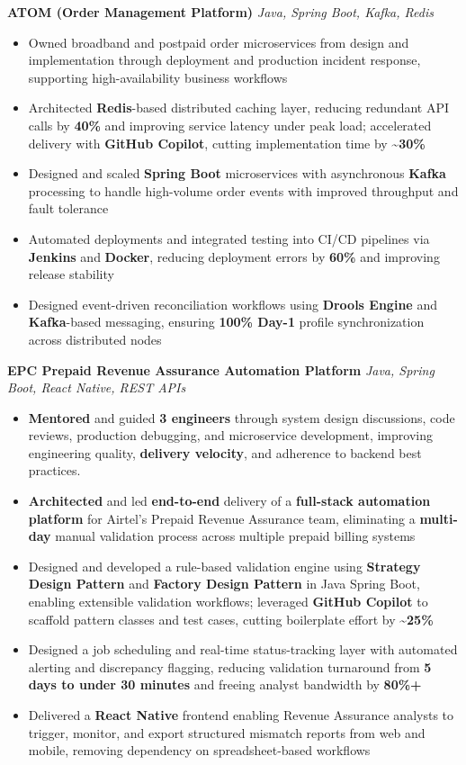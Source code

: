 \documentclass[letterpaper,11pt]{article}
\newcommand{\resumeItem}[1]{
  \item\small{{#1 \vspace{-2pt}}}
}
\newcommand{\resumeItemListStart}{\begin{itemize}}
\newcommand{\resumeItemListEnd}{\end{itemize}\vspace{-5pt}}
\begin{document}
      \vspace{4pt}
      \textbf{\small ATOM (Order Management Platform)} \hfill \textit{\small Java, Spring Boot, Kafka, Redis} \\
      \vspace{-2pt}
      \resumeItemListStart
        \resumeItem{Owned broadband and postpaid order microservices from design and implementation through deployment and production incident response, supporting high-availability business workflows}
        \resumeItem{Architected \textbf{Redis}-based distributed caching layer, reducing redundant API calls by \textbf{40\%} and improving service latency under peak load; accelerated delivery with \textbf{GitHub Copilot}, cutting implementation time by \textbf{\textasciitilde{}30\%}}
        \resumeItem{Designed and scaled \textbf{Spring Boot} microservices with asynchronous \textbf{Kafka} processing to handle high-volume order events with improved throughput and fault tolerance}
        \resumeItem{Automated deployments and integrated testing into CI/CD pipelines via \textbf{Jenkins} and \textbf{Docker}, reducing deployment errors by \textbf{60\%} and improving release stability}
        \resumeItem{Designed event-driven reconciliation workflows using \textbf{Drools Engine} and \textbf{Kafka}-based messaging, ensuring \textbf{100\% Day-1} profile synchronization across distributed nodes}
      \resumeItemListEnd

      \vspace{4pt}
      \textbf{\small EPC Prepaid Revenue Assurance Automation Platform} \hfill \textit{\small Java, Spring Boot, React Native, REST APIs} \\
      \vspace{-2pt}
      \resumeItemListStart
        \resumeItem{\textbf{Mentored} and guided \textbf{3 engineers} through system design discussions, code reviews, production debugging, and microservice development, improving engineering quality, \textbf{delivery velocity}, and adherence to backend best practices.}
        \resumeItem{\textbf{Architected} and led \textbf{end-to-end} delivery of a \textbf{full-stack automation platform} for Airtel's Prepaid Revenue Assurance team, eliminating a \textbf{multi-day} manual validation process across multiple prepaid billing systems}
        \resumeItem{Designed and developed a rule-based validation engine using \textbf{Strategy Design Pattern} and \textbf{Factory Design Pattern} in Java Spring Boot, enabling extensible validation workflows; leveraged \textbf{GitHub Copilot} to scaffold pattern classes and test cases, cutting boilerplate effort by \textbf{\textasciitilde{}25\%}}
        \resumeItem{Designed a job scheduling and real-time status-tracking layer with automated alerting and discrepancy flagging, reducing validation turnaround from \textbf{5 days to under 30 minutes} and freeing analyst bandwidth by \textbf{80\%+}}
        \resumeItem{Delivered a \textbf{React Native} frontend enabling Revenue Assurance analysts to trigger, monitor, and export structured mismatch reports from web and mobile, removing dependency on spreadsheet-based workflows}
      \resumeItemListEnd
\end{document}
